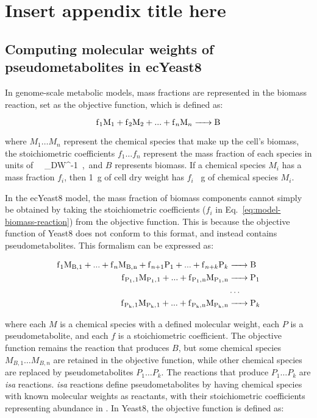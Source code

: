\chapter{Insert appendix title here}
\label{append:model}

\section{Computing molecular weights of pseudometabolites in ecYeast8}
\label{append:model-molweights}

In genome-scale metabolic models, mass fractions are represented in the biomass reaction, set as the objective function, which is defined as:

\begin{equation}
  \ce{f_{1}M1 + f_{2}M2 + ... + f_{n}M_{n} -> B}
  \label{eq:model-biomass-reaction}
\end{equation}

where $M_{1} \ldots M_{n}$ represent the chemical species that make up the cell's biomass, the stoichiometric coefficients $f_{1} \ldots f_{n}$ represent the mass fraction of each species in units of \SI{}{\gram~\gram_{DW}^{-1}}, and $B$ represents biomass.
If a chemical species $M_{i}$ has a mass fraction $f_{i}$, then \SI{1}{\gram} of cell dry weight has $f_{i}$ \SI{}{\gram} of chemical species $M_{i}$.

In the ecYeast8 model, the mass fraction of biomass components cannot simply be obtained by taking the stoichiometric coefficients ($f_{i}$ in Eq.\ \ref{eq:model-biomass-reaction}) from the objective function.
This is because the objective function of Yeast8 does not conform to this format, and instead contains pseudometabolites.
This formalism can be expressed as:

\begin{equation}
  \begin{aligned}
    \ce{f_{1}M_{B,1} + ... + f_{n}M_{B,n} + f_{n+1}P1 + ... + f_{n+k}P_{k} &-> B}\\
    \ce{f_{P_{1},1}M_{P_{1},1} + ... + f_{P_{1},n}M_{P_{1},n} &-> P1}\\
    &\ldots\\
    \ce{f_{P_{k},1}M_{P_{k},1} + ... + f_{P_{k},n}M_{P_{k},n} &-> P_{k}}
    \label{eq:model-pseudometabolites}
  \end{aligned}
\end{equation}

where each $M$ is a chemical species with a defined molecular weight, each $P$ is a pseudometabolite, and each $f$ is a stoichiometric coefficient.
The objective function remains the reaction that produces $B$, but some chemical species $M_{B,1} \ldots M_{B,n}$ are retained in the objective function, while other chemical species are replaced by pseudometabolites $P_{1} \ldots P_{k}$.
The reactions that produce $P_{1} \ldots P_{k}$ are \textit{isa} reactions.
\textit{isa} reactions define pseudometabolites by having chemical species with known molecular weights as reactants, with their stoichiometric coefficients representing abundance in \SI{}{\mmolgdw}.
In Yeast8, the objective function is defined as:

